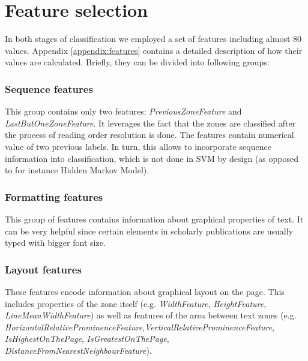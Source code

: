 \section{Feature selection}
In both stages of classification we employed a set of features including almost 80 values. Appendix \ref{appendix:features} contains a detailed description of how their values are calculated. Briefly, they can be divided into following groups:

\subsubsection{Sequence features}
This group contains only two features: \textit{PreviousZoneFeature} and \textit{LastButOneZoneFeature}. It leverages the fact that the zones are classified after the process of reading order resolution is done. The features contain numerical value of two previous labels. In turn, this allows to incorporate sequence information into classification, which is not done in SVM by design (as opposed to for instance Hidden Markov Model).

\subsubsection{Formatting features}
This group of features contains information about graphical properties of text. It can be very helpful since certain elements in scholarly publications are usually typed with bigger font size.

\subsubsection{Layout features}
These features encode information about graphical layout on the page. This includes properties of the zone itself (e.g. \textit{WidthFeature}, \textit{HeightFeature}, \textit{LineMeanWidthFeature}) as well as features of the area between text zones (e.g. \textit{HorizontalRelativeProminenceFeature},\textit{VerticalRelativeProminenceFeature}, \textit{IsHighestOnThePage}, \textit{IsGreatestOnThePage}, \textit{DistanceFromNearestNeighbourFeature}).

